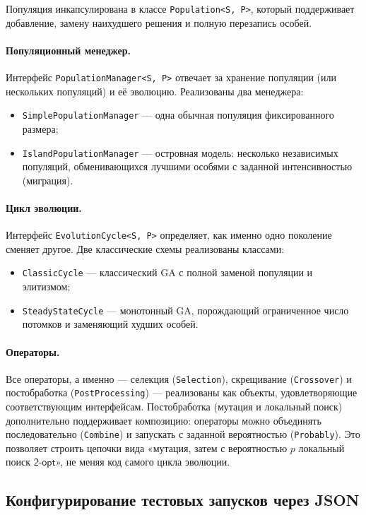\documentclass[a4paper,12pt]{article}
\begin{document}
Популяция инкапсулирована в классе \texttt{Population<S, P>}, который поддерживает добавление, замену наихудшего решения и полную перезапись особей.

\paragraph{Популяционный менеджер.} Интерфейс \texttt{PopulationManager<S, P>} отвечает за хранение популяции (или нескольких популяций) и её эволюцию. Реализованы два менеджера:
\begin{itemize}
\item \texttt{SimplePopulationManager} — одна обычная популяция фиксированного размера;
\item \texttt{IslandPopulationManager} — островная модель: несколько независимых популяций, обменивающихся лучшими особями с заданной интенсивностью (миграция).
\end{itemize}

\paragraph{Цикл эволюции.} Интерфейс \texttt{EvolutionCycle<S, P>} определяет, как именно одно поколение сменяет другое. Две классические схемы реализованы классами:
\begin{itemize}
\item \texttt{ClassicCycle} — классический GA с полной заменой популяции и элитизмом;
\item \texttt{SteadyStateCycle} — монотонный GA, порождающий ограниченное число потомков и заменяющий худших особей.
\end{itemize}

\paragraph{Операторы.} Все операторы, а именно --- селекция (\texttt{Selection}), скрещивание (\texttt{Crossover}) и постобработка (\texttt{PostProcessing}) --- реализованы как объекты, удовлетворяющие соответствующим интерфейсам. Постобработка (мутация и локальный поиск) дополнительно поддерживает композицию: операторы можно объединять последовательно (\texttt{Combine}) и запускать с заданной вероятностью (\texttt{Probably}). Это позволяет строить цепочки вида «мутация, затем с вероятностью $p$ локальный поиск $\mathsf{2\mbox{-}opt}$», не меняя код самого цикла эволюции.

\subsection{Конфигурирование тестовых запусков через JSON}
\end{document}
